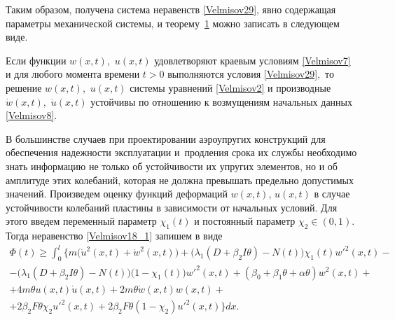 Таким образом, получена система неравенств \eqref{Velmisov29}, явно содержащая параметры механической системы, и теорему~\hyperlink{Velm:th1}{1}  можно записать в следующем виде. 

\smallskip

\hypertarget{Velm:th2}{}
\begin{theorem}[2]Если функции $w(x,t),$ $u(x,t)$ удовлетворяют краевым условиям \eqref{Velmisov7} и для любого момента времени $t>0$ выполняются условия \eqref{Velmisov29}$,$ то решение $w(x,t),$ $u(x,t)$ системы уравнений \eqref{Velmisov2} и производные $\dot{w}(x,t),$ $\dot{u}(x,t)$ устойчивы по отношению к возмущениям начальных данных \eqref{Velmisov8}$.$
\end{theorem}

\smallskip 

 В большинстве случаев при проектировании аэроупругих конструкций для обеспечения надежности эксплуатации и~продления срока их службы необходимо знать информацию не только об устойчивости их упругих элементов, но и об амплитуде этих колебаний, которая не должна превышать предельно допустимых значений. Произведем оценку функций деформаций $w(x,t)$, $u(x,t)$ в случае устойчивости колебаний пластины в зависимости от начальных условий. Для этого введем переменный параметр $\chi_1(t)$ и постоянный параметр $\chi_2\in(0,1)$. Тогда неравенство \eqref{Velmisov18_1} запишем в виде 
\begin{multline}
\label{Velmisov30}
\Phi (t)\ge \int _{0}^{l}
\bigl\{
m \bigl(\dot{u}^{2} (x,t)+\dot{w}^{2} (x,t)\bigr)+
\bigl(\lambda_1(D+\beta _{2}I \theta) -N(t)\bigr)\chi_1(t)w'^{2} (x,t)-
\\ 
-\bigl(\lambda_1(D+\beta _{2}I \theta) -N(t)\bigr) \bigl(1-\chi_1(t)\bigr)w'^{2} (x,t)+
(\beta _{0}+\beta _{1} \theta+ \alpha \theta) w^{2} (x,t)+
\\
+4m\theta u(x,t)\dot{u}(x,t)+2m\theta \dot{w}(x,t)w(x,t)+ 
\\ +2\beta _{2}F \theta\chi_2 u'^{2} (x,t)
 +2\beta _{2}F \theta(1-\chi_2) u'^{2} (x,t)\bigr\}dx.
\end{multline}


